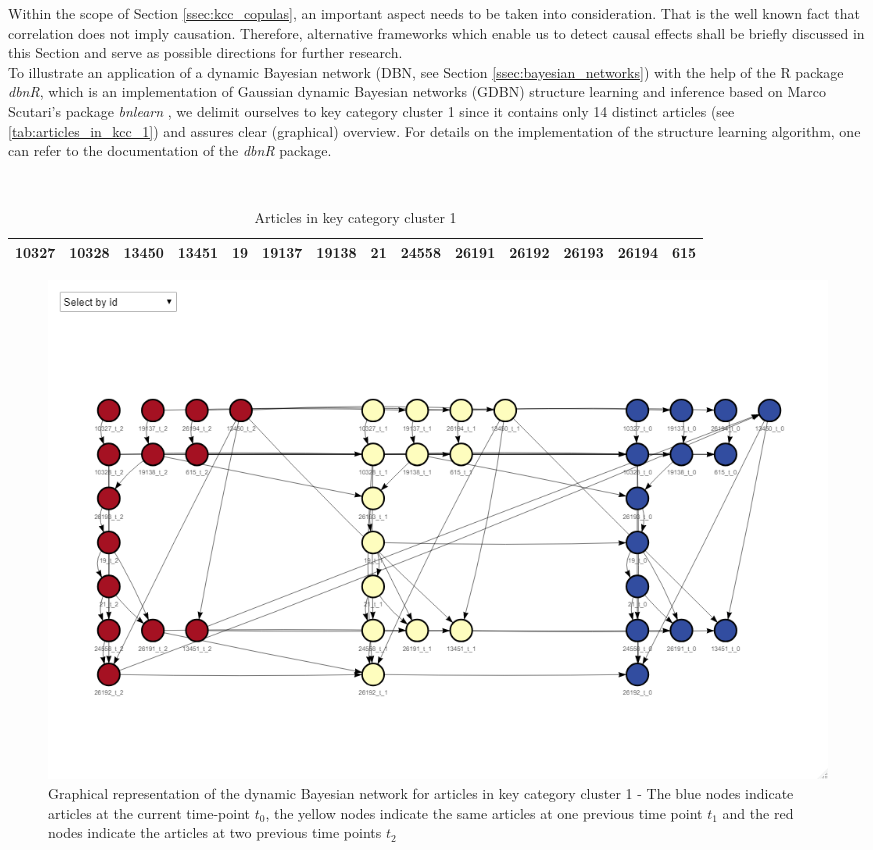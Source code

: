 
Within the scope of Section \ref{ssec:kcc_copulas}, an important aspect needs to be taken into consideration. That is the well known fact that correlation does not imply causation. Therefore, alternative frameworks which enable us to detect causal effects shall be briefly discussed in this Section and serve as possible directions for further research.
\\
To illustrate an application of a dynamic Bayesian network (\ac{DBN}, see Section \ref{ssec:bayesian_networks}) with the help of the R package \textit{dbnR}, which is an implementation of Gaussian dynamic Bayesian networks (GDBN) structure learning and inference based on Marco Scutari’s package \textit{bnlearn} \citep{bnlearn_package}, we delimit ourselves to key category cluster 1 since it contains only 14 distinct articles (see \autoref{tab:articles_in_kcc_1}) and assures clear (graphical) overview. 
For details on the implementation of the structure learning algorithm, one can refer to the documentation of the \textit{dbnR} package.
\\

\begin{table}[H]
\setlength\arrayrulewidth{1pt}  
\centering
\begin{adjustbox}{max width=\textwidth}\
\begin{tabular}{|c|c|c|c|c|c|c|c|c|c|c|c|c|c|}
\hline
10327 & 10328 & 13450 & 13451 & 19 & 19137 & 19138 & 21 & 24558 & 26191 & 26192 & 26193 & 26194 & 615 \\ \hline
\end{tabular}
\end{adjustbox}
\caption{Articles in key category cluster 1}
\label{tab:articles_in_kcc_1}
\end{table}








\begin{figure}[H]
\centering
  \includegraphics[width=0.85\linewidth]{figures/dbn_kcc_1_all.png}
  \caption{Graphical representation of the dynamic Bayesian network for articles in key category cluster 1 - The blue nodes indicate articles at the current time-point $t_0$, the yellow nodes indicate the same articles at one previous time point $t_1$ and the red nodes indicate the articles at two previous time points $t_2$}
  \label{fig:dbn_kcc_1_all}
\end{figure}




